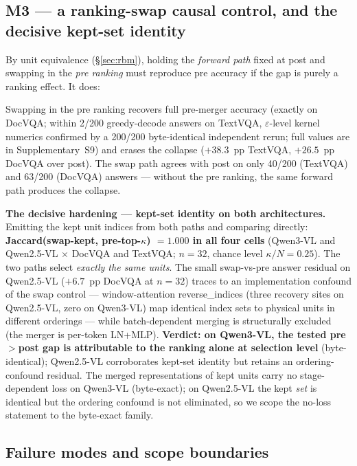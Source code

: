 \documentclass[sigconf,nonacm]{acmart}
\begin{document}
\subsection{M3 --- a ranking-swap causal control, and the decisive kept-set identity}\label{sec:m3}

By unit equivalence (\S\ref{sec:rbm}), holding the \emph{forward path} fixed at
post and swapping in the \emph{pre ranking} must reproduce pre accuracy if the
gap is purely a ranking effect. It does:

Swapping in the pre ranking recovers full pre-merger accuracy (exactly on
DocVQA; within 2/200 greedy-decode answers on TextVQA, $\varepsilon$-level
kernel numerics confirmed by a 200/200 byte-identical independent rerun; full
values are in Supplementary~S9) and
erases the collapse ($+38.3$~pp TextVQA, $+26.5$~pp DocVQA over post). The swap
path agrees with post on only 40/200 (TextVQA) and 63/200 (DocVQA) answers ---
without the pre ranking, the same forward path produces the collapse.

\textbf{The decisive hardening --- kept-set identity on both architectures.}
Emitting the kept unit indices from both paths and comparing directly:
\textbf{Jaccard(swap-kept, pre-top-$\kappa$) $= 1.000$ in all four cells}
(Qwen3-VL and Qwen2.5-VL $\times$ DocVQA and TextVQA; $n = 32$, chance level
$\kappa/N = 0.25$). The two paths select \emph{exactly the same units}. The
small swap-vs-pre answer residual on Qwen2.5-VL ($+6.7$~pp DocVQA at $n = 32$)
traces to an implementation confound of the swap control --- window-attention
reverse\_indices (three recovery sites on Qwen2.5-VL, zero on Qwen3-VL) map
identical index sets to physical units in different orderings --- while
batch-dependent merging is structurally excluded (the merger is per-token
LN+MLP). \textbf{Verdict: on Qwen3-VL, the tested pre$>$post gap is attributable
to the ranking alone at selection level} (byte-identical); Qwen2.5-VL
corroborates kept-set identity but retains an ordering-confound residual.
The merged representations of kept units carry no stage-dependent loss on
Qwen3-VL (byte-exact); on Qwen2.5-VL the kept \emph{set} is identical but the
ordering confound is not eliminated, so we scope the no-loss statement to the
byte-exact family.

\subsection{Failure modes and scope boundaries}\label{sec:modes}
\end{document}
